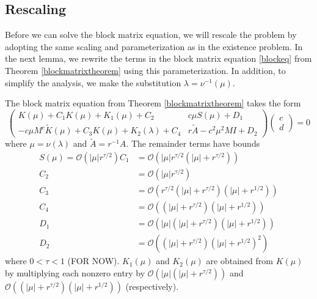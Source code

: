 \documentclass[thesis.tex]{subfiles}
\begin{document}
\subsection{Rescaling}

Before we can solve the block matrix equation, we will rescale the problem by adopting the same scaling and parameterization as in the existence problem. In the next lemma, we rewrite the terms in the block matrix equation \eqref{blockeq} from Theorem \ref{blockmatrixtheorem} using this parameterization. In addition, to simplify the analysis, we make the substitution $\lambda = \nu^{-1}(\mu)$.

\begin{lemma}\label{reparam}
The block matrix equation from Theorem \ref{blockmatrixtheorem} takes the form
\begin{equation}\label{blockeq2}
\begin{pmatrix}
K(\mu) + C_1 K(\mu) + K_1(\mu) + C_2 & c \mu S(\mu) + D_1 \\
-c \mu M^c \tilde{K}(\mu) + C_3 K(\mu) + K_2(\lambda) + C_4 & r \tilde{A} - c^2 \mu^2 MI + D_2
\end{pmatrix}
\begin{pmatrix} c \\ d \end{pmatrix} = 0
\end{equation}
where $\mu = \nu(\lambda)$ and $\tilde{A} = r^{-1} A$. The remainder terms have bounds
\begin{align*}
S(\mu) = \mathcal{O}(|\mu|r^{\tau/2})
C_1 &= \mathcal{O}(|\mu|r^{\tau/2}(|\mu| + r^{\tau/2})) \\
C_2 &= \mathcal{O}(|\mu|r^{\tau/2}) \\
C_3 &= \mathcal{O}(r^{\tau/2} (|\mu| + r^{\tau/2})(|\mu| + r^{1/2}))  \\
C_4 &= \mathcal{O}((|\mu| + r^{\tau/2})(|\mu| + r^{1/2})) \\
D_1 &= \mathcal{O}(|\mu|(|\mu| + r^{\tau/2})(|\mu| + r^{1/2})) \\
D_2 &= \mathcal{O}((|\mu| + r^{\tau/2})(|\mu| + r^{1/2})^2)
\end{align*}
where $0 < \tau < 1$ (FOR NOW). $K_1(\mu)$ and $K_2(\mu)$ are obtained from $K(\mu)$ by multiplying each nonzero entry by $\mathcal{O}(|\mu|(|\mu| + r^{\tau/2}))$ and $\mathcal{O}((|\mu| + r^{\tau/2})(|\mu| + r^{1/2}))$ (respectively). 


\end{lemma}
\end{document}
